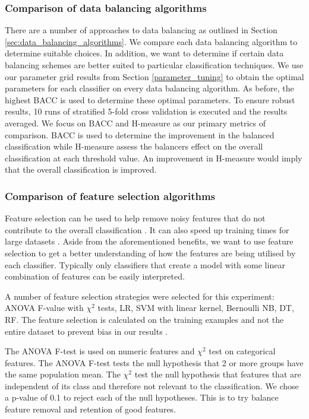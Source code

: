 \documentclass{sig-alternate-05-2015}
\begin{document}
	\subsubsection{Comparison of data balancing algorithms}
	There are a number of approaches to data balancing as outlined in Section \ref{sec:data_balancing_algorithms}. We compare each data balancing algorithm to determine suitable choices. In addition, we want to determine if certain data balancing schemes are better suited to particular classification techniques. We use our parameter grid results from Section \ref{parameter_tuning} to obtain the optimal parameters for each classifier on every data balancing algorithm. As before, the highest BACC is used to determine these optimal parameters. To ensure robust results, 10 runs of stratified 5-fold cross validation is executed and the results averaged. We focus on BACC and H-measure as our primary metrics of comparison. BACC is used to determine the improvement in the balanced classification while H-measure assess the balancers effect on the overall classification at each threshold value. An improvement in H-measure would imply that the overall classification is improved.
	
	\subsubsection{Comparison of feature selection algorithms}
	Feature selection can be used to help remove noisy features that do not contribute to the overall classification \cite{Guyon:2003:IVF:944919.944968}. It can also speed up training times for large datasets \cite{Guyon:2003:IVF:944919.944968}. Aside from the aforementioned benefits, we want to use feature selection to get a better understanding of how the features are being utilised by each classifier. Typically only classifiers that create a model with some linear combination of features can be easily interpreted.
	
	A number of feature selection strategies were selected for this experiment: ANOVA F-value with $\chi^2$ tests, LR, SVM with linear kernel, Bernoulli NB, DT, RF. The feature selection is calculated on the training examples and not the entire dataset to prevent bias in our results \cite{PMID:25988841}.
	
	The ANOVA F-test is used on numeric features and $\chi^2$ test on categorical features. The ANOVA F-test tests the null hypothesis that 2 or more groups have the same population mean. The $\chi^2$ test the null hypothesis that features that are independent of its class and therefore not relevant to the classification. We chose a p-value of 0.1 to reject each of the null hypotheses. This is to try balance feature removal and retention of good features.
	
\end{document}
